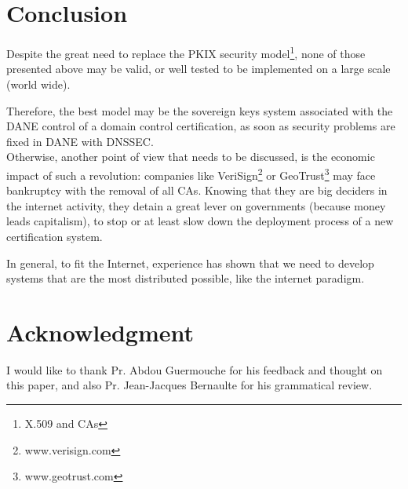 \documentclass[journal, a4paper]{IEEEtran}
\begin{document}
\section{Conclusion}
\label{conclusion}

Despite the great need to replace the PKIX security model\footnote{X.509 and CAs}, none of those presented above may be valid, or well tested to be implemented on a large scale (world wide).

Therefore, the best model may be the sovereign keys system associated with the DANE control of a domain control certification, as soon as security problems are fixed in DANE with DNSSEC.\\

Otherwise, another point of view that needs to be discussed, is the economic impact of such a revolution: companies like VeriSign\footnote{www.verisign.com} or GeoTrust\footnote{www.geotrust.com} may face bankruptcy with the removal of all CAs. Knowing that they are big deciders in the internet activity, they detain a great lever on governments (because money leads capitalism), to stop or at least slow down the deployment process of a new certification system.

In general, to fit the Internet, experience has shown that we need to develop systems that are the most distributed possible, like the internet paradigm.

\section*{Acknowledgment}
\label{acknowledgment}

I would like to thank Pr. Abdou Guermouche for his feedback and thought on this paper, and also Pr. Jean-Jacques Bernaulte for his grammatical review.


\nocite{*}
\end{document}
